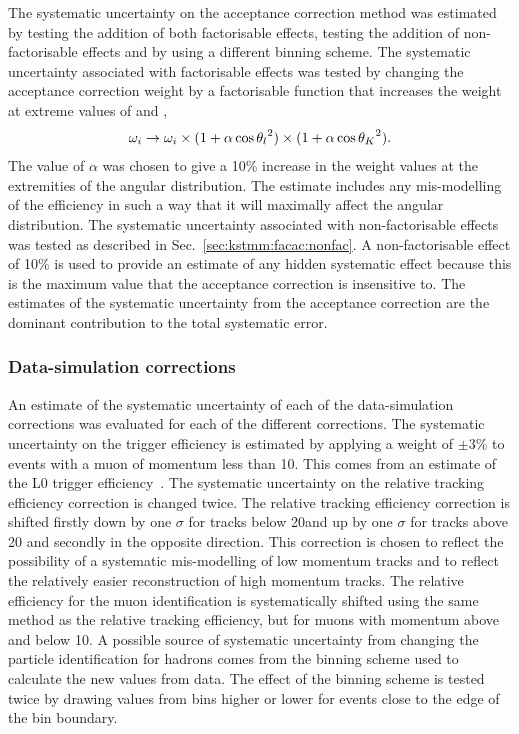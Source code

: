 The systematic uncertainty on the acceptance correction method was estimated by testing the addition
 of both factorisable effects, testing the addition of  non-factorisable effects and by using a different \qsq binning scheme.
The systematic uncertainty associated with factorisable effects was tested by changing the 
acceptance correction weight by a factorisable function that increases the weight at extreme values of 
\ctl and \ctk,
\begin{align}
\omega_i \rightarrow \omega_i \times ( 1 + \alpha \cos{\theta_l}^2 ) \times ( 1 + \alpha \cos{\theta_K}^2 ) .
\end{align}
The value of $\alpha$ was chosen to give a 10\% increase in the weight values at the extremities of the 
angular distribution. 
The estimate includes any mis-modelling of the efficiency in such a way that it will maximally affect the angular distribution.
The systematic uncertainty associated with non-factorisable effects was tested as described in Sec.~\ref{sec:kstmm:facac:nonfac}.
A non-factorisable effect of 10\% is used to provide an estimate of any hidden systematic effect because this is the maximum value that the 
acceptance correction is insensitive to.
The estimates of the systematic uncertainty from the acceptance correction are the dominant contribution to the total systematic error.


\subsubsection{Data-simulation corrections}

An estimate of the systematic uncertainty of each of the data-simulation corrections was evaluated for each of the different corrections.
The systematic uncertainty on the trigger efficiency is estimated by applying a weight of $\pm3\%$ to events with a muon of momentum less than 10\gev.
This comes from an estimate of the L0 trigger efficiency~\cite{Aaij:2012me}.
The systematic uncertainty on the relative tracking efficiency correction is changed twice. 
The relative tracking efficiency correction is shifted firstly down by one $\sigma$ for tracks below 20\gev and up by one $\sigma$ for tracks above 20\gev
 and secondly in the opposite direction.
This correction is chosen to reflect the possibility of a systematic mis-modelling of low momentum tracks and
to reflect the relatively easier reconstruction of high momentum tracks.
The relative efficiency for the muon identification is systematically shifted using the same method as the
relative tracking efficiency, but for muons with momentum above and below 10\gevc.
A possible source of systematic uncertainty from changing the particle identification for hadrons comes from the binning scheme used to calculate the new \dll values from data.
The effect of the binning scheme is tested twice by drawing \dll values from bins higher or lower for events close to the edge of the bin boundary.

